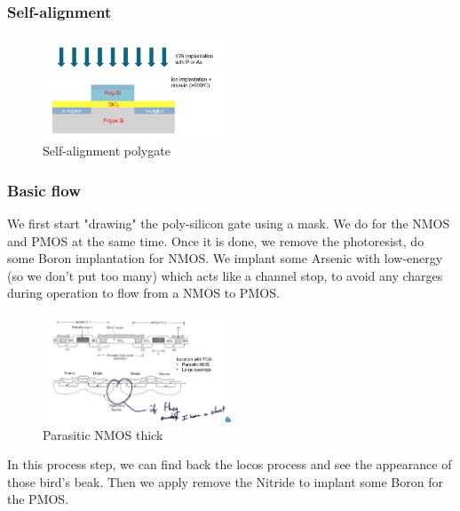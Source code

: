 \documentclass[
]{article}
\begin{document}
\hypertarget{self-alignment}{%
\subsubsection{Self-alignment}\label{self-alignment}}

\begin{figure}
\hypertarget{fig:enter-label}{%
\centering
\includegraphics[width=0.5\textwidth,height=\textheight]{self_alignment_poly.png}
\caption{Self-alignment polygate}\label{fig:enter-label}
}
\end{figure}

\hypertarget{basic-flow}{%
\subsubsection{Basic flow}\label{basic-flow}}

We first start "drawing" the poly-silicon gate using a mask. We do for
the NMOS and PMOS at the same time. Once it is done, we remove the
photoresist, do some Boron implantation for NMOS. We implant some
Arsenic with low-energy (so we don't put too many) which acts like a
channel stop, to avoid any charges during operation to flow from a NMOS
to PMOS.

\begin{figure}
\hypertarget{fig:enter-label}{%
\centering
\includegraphics[width=0.5\textwidth,height=\textheight]{parasitic_NMOS.png}
\caption{Parasitic NMOS thick}\label{fig:enter-label}
}
\end{figure}

In this process step, we can find back the {locos} process and see the
appearance of those bird's beak. Then we apply remove the Nitride to
implant some Boron for the PMOS.
\end{document}
